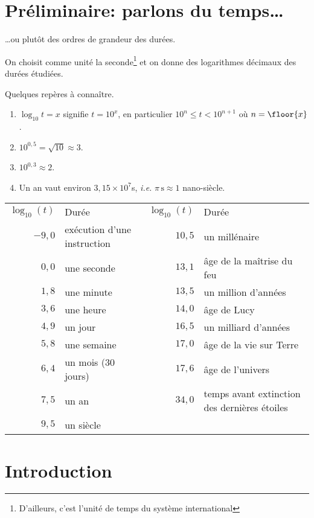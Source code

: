 \section{Préliminaire: parlons du temps\ldots{}}

\ldots{}ou plutôt des ordres de grandeur des durées.

On choisit comme unité la seconde\footnote{D'ailleurs, c'est l'unité de temps du système international} et on donne des logarithmes décimaux des durées étudiées.

Quelques repères à connaître.
\begin{enumerate}
\item  $\log_{10} t = x$ signifie $t = 10^{x}$, en particulier
$10^{n}\leq t < 10^{n+1}$ où $n = \floor{x}$.
\item $10^{0,5} = \sqrt{10} \approx 3$.
\item $10^{0,3} \approx 2$.
\item Un an vaut environ $3,15\times 10^{7}$s, \emph{i.e.} $\pi \,\mathrm{s} \approx 1$ nano-siècle.
\end{enumerate}

\begin{center}
  \begin{tabular}{rl rl}
  $\log_{10}(t)$ & Durée &   $\log_{10}(t)$ & Durée \\
  $-9,0$ & exécution d'une instruction &  $10,5$ & un millénaire\\
  $0,0$ & une seconde &  $13,1$ & âge de la maîtrise du feu\\
  $1,8$ & une minute &  $13,5$ & un million d'années\\
  $3,6$ & une heure &  $14,0$ & âge de Lucy\\
  $4,9$ & un jour &  $16,5$ & un milliard d'années\\
  $5,8$ & une semaine&  $17,0$ & âge de la vie sur Terre\\
  $6,4$ & un mois (30 jours)&  $17,6$ & âge de l'univers\\
  $7,5$ & un an &  $34,0$ & temps avant extinction des dernières étoiles\\
  $9,5$ & un siècle\\
\end{tabular}
\end{center}


\section{Introduction}

